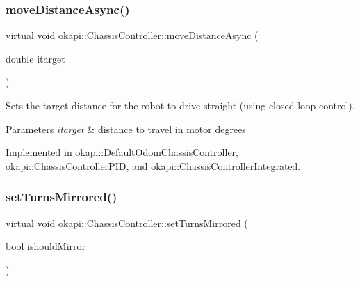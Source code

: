 \mbox{\label{classokapi_1_1ChassisController_a24b46ec1c42f32c0527d57738a07820a}} 
\subsubsection{\texorpdfstring{moveDistanceAsync()}{moveDistanceAsync()}\hspace{0.1cm}{\footnotesize\ttfamily [2/2]}}
{\footnotesize\ttfamily virtual void okapi\+::\+Chassis\+Controller\+::move\+Distance\+Async (\begin{DoxyParamCaption}\item[{double}]{itarget }\end{DoxyParamCaption})\hspace{0.3cm}{\ttfamily [pure virtual]}}

Sets the target distance for the robot to drive straight (using closed-\/loop control).


\begin{DoxyParams}{Parameters}
{\em itarget} & distance to travel in motor degrees \\
\hline
\end{DoxyParams}


Implemented in \mbox{\hyperlink{classokapi_1_1DefaultOdomChassisController_ab1abaec33ecce2515895d3a8af363c8c}{okapi\+::\+Default\+Odom\+Chassis\+Controller}}, \mbox{\hyperlink{classokapi_1_1ChassisControllerPID_a7a13b5cd2fe7bce73cf0e3a3144fe6db}{okapi\+::\+Chassis\+Controller\+P\+ID}}, and \mbox{\hyperlink{classokapi_1_1ChassisControllerIntegrated_ab3cb8eb0c7d5162aafffe8b8ec2751d5}{okapi\+::\+Chassis\+Controller\+Integrated}}.

\mbox{\label{classokapi_1_1ChassisController_a37ae36ec8936272eb31e3baed7eed417}} 
\subsubsection{\texorpdfstring{setTurnsMirrored()}{setTurnsMirrored()}}
{\footnotesize\ttfamily virtual void okapi\+::\+Chassis\+Controller\+::set\+Turns\+Mirrored (\begin{DoxyParamCaption}\item[{bool}]{ishould\+Mirror }\end{DoxyParamCaption})\hspace{0.3cm}{\ttfamily [pure virtual]}}

